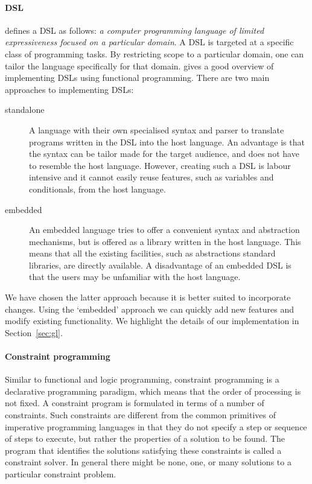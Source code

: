 \paragraph{\acl{DSL}} \citet{fowler} defines a \ac{DSL} as follows:
%
\emph{a computer programming language of limited expressiveness
  focused on a particular domain}.
%
A \ac{DSL} is targeted at a specific class of programming tasks.
%
By restricting scope to a particular domain, one can tailor the
language specifically for that domain.
%
\citet{Gibbons2015} gives a good overview of implementing \acp{DSL}
using functional programming.
%
There are two main approaches to implementing \acp{DSL}:
\begin{description}
\item[standalone] A language with their own specialised syntax and
  parser to translate programs written in the \ac{DSL} into the host
  language.
%
  An advantage is that the syntax can be tailor made for the target
  audience, and does not have to resemble the host language.
%
  However, creating such a \ac{DSL} is labour intensive and it cannot
  easily reuse features, such as variables and conditionals, from the
  host language.
\item[embedded] An embedded language tries to offer a convenient
  syntax and abstraction mechanisms, but is offered as a library
  written in the host language.
%
  This means that all the existing facilities, such as abstractions
  standard libraries, are directly available.
%
  A disadvantage of an embedded \ac{DSL} is that the users may be
  unfamiliar with the host language.
\end{description}
%
We have chosen the latter approach because it is better suited
to incorporate changes. Using the `embedded' approach we can quickly
add new features and modify existing functionality. We highlight the
details of our implementation in Section~\ref{sec:gl}.


\paragraph{Constraint programming} Similar to functional and logic
programming, constraint programming is a declarative programming
paradigm, which means that the order of processing is not fixed.
%
A constraint program is formulated in terms of a number of
constraints.
%
Such constraints are different from the common primitives of
imperative programming languages in that they do not specify a step or
sequence of steps to execute, but rather the properties of a solution
to be found.
%
The program that identifies the solutions satisfying these constraints
is called a constraint solver.
%
In general there might be none, one, or many solutions to a particular
constraint problem.

